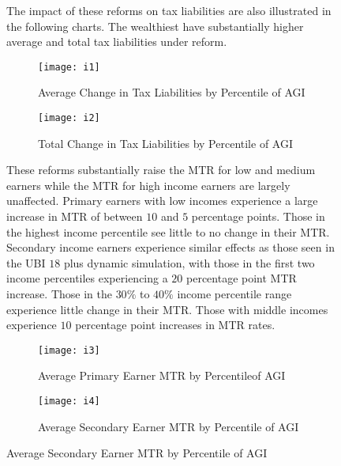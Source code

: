 \documentclass{article}
\begin{document}
\begin{figure}[H]
\begin{table}[H]
\caption{Change in Tax Liabilities by Percentile of AGI}

\begin{center}
\begin{adjustbox}{max width=\textwidth}

\end{adjustbox}
\end{center}
\end{table}

The impact of these reforms on tax liabilities are also illustrated in the following charts. The wealthiest have substantially higher average and total tax liabilities under reform.

\begin{figure}[H]
\centering
\caption{Average Change in Tax Liabilities by Percentile of AGI}
\texttt{[image: i1]}
\end{figure}

\begin{figure}[H]
\centering
\caption{Total Change in Tax Liabilities by Percentile of AGI}
\texttt{[image: i2]}
\end{figure}

These reforms substantially raise the MTR for low and medium earners while the MTR for high income earners are largely unaffected.
Primary earners with low incomes experience a large increase in MTR of between $10$ and $5$ percentage points. Those in the highest income percentile see little to no change in their MTR. Secondary income earners experience similar effects as those seen in the UBI $18$ plus dynamic simulation, with those in the first two income percentiles experiencing a $20$ percentage point MTR increase. Those in the $30\%$ to $40\%$ income percentile range experience little change in their MTR. Those with middle incomes experience $10$ percentage point increases in MTR rates.

\begin{figure}[H]
\centering
\caption{Average Primary Earner MTR by Percentileof AGI}
\texttt{[image: i3]}
\end{figure}

\begin{figure}[H]
\centering
\caption{Average Secondary Earner MTR by Percentile of AGI}
\texttt{[image: i4]}
\end{figure}


\end{figure}
\end{document}

